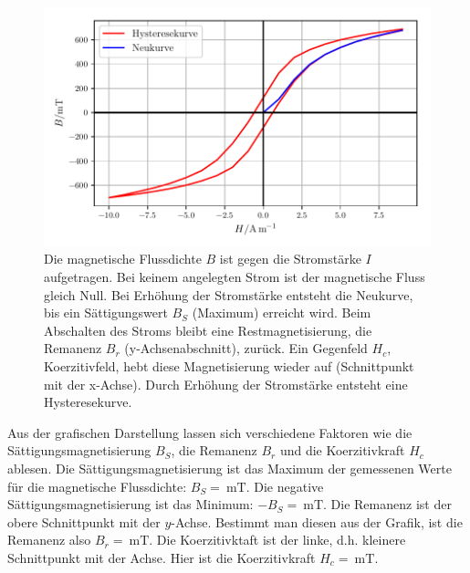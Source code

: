 \begin{figure}
    \centering
    \includegraphics{build/plotc.pdf}
    \caption{Die magnetische Flussdichte $B$ ist gegen die Stromstärke $I$
    aufgetragen. Bei keinem angelegten Strom ist der magnetische Fluss
    gleich Null. Bei Erhöhung der Stromstärke entsteht die Neukurve, bis
    ein Sättigungswert $B_{S}$ (Maximum) erreicht wird. Beim Abschalten des Stroms
    bleibt eine Restmagnetisierung, die Remanenz $B_{r}$ (y-Achsenabschnitt),
    zurück. Ein Gegenfeld $H_{c}$, Koerzitivfeld, hebt diese Magnetisierung wieder
    auf (Schnittpunkt mit der x-Achse). Durch Erhöhung der Stromstärke entsteht
    eine Hysteresekurve.}
    \label{plotc}
\end{figure}

\noindent Aus der grafischen Darstellung lassen sich verschiedene Faktoren
wie die Sättigungsmagnetisierung $B_{S}$, die Remanenz $B_{r}$ und die
Koerzitivkraft $H_{c}$ ablesen.
Die Sättigungsmagnetisierung ist das Maximum der gemessenen Werte für
die magnetische Flussdichte: $B_{S} = \SI{}{\milli\tesla}$. %
Die negative Sättigungsmagnetisierung ist das Minimum:
$-B_{S} = \SI{}{\milli\tesla}$. %
Die Remanenz ist der obere Schnittpunkt mit der $y$-Achse.
Bestimmt man diesen aus der Grafik, ist die Remanenz also
$B_{r} = \SI{}{\milli\tesla}$. %
Die Koerzitivktaft ist der linke, d.h. kleinere Schnittpunkt mit der Achse.
Hier ist die Koerzitivkraft $H_{c} = \SI{}{\milli\tesla}$. %
